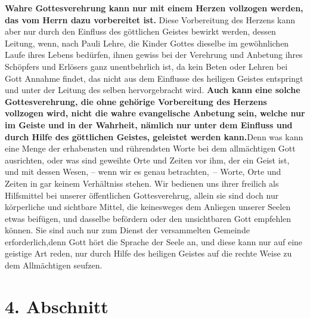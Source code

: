 \label{ref:06_03_gottesdiensvorbereitung}
\textbf{Wahre
Gottesverehrung kann nur mit einem Herzen vollzogen werden, das vom Herrn
dazu vorbereitet ist.} Diese Vorbereitung des Herzens kann aber nur
durch den Einfluss des göttlichen Geistes bewirkt werden, dessen Leitung, wenn,
nach Pauli Lehre, die Kinder Gottes dieselbe im gewöhnlichen Laufe ihres Lebens
bedürfen, ihnen gewiss bei der Verehrung und Anbetung ihres Schöpfers und
Erlösers ganz unentbehrlich ist, da kein Beten oder Lehren bei Gott Annahme
findet,
das nicht aus dem Einflusse des
heiligen Geistes entspringt und unter der Leitung des selben hervorgebracht
wird. \textbf{Auch kann eine solche Gottesverehrung,
die ohne
gehörige Vorbereitung des Herzens vollzogen wird, nicht die wahre evangelische
Anbetung sein, welche nur im Geiste und in der Wahrheit, nämlich nur unter dem
Einfluss und durch Hilfe des göttlichen Geistes, geleistet werden
kann.}Denn was kann eine Menge der
erhabensten und rührendsten Worte bei dem
allmächtigen Gott ausrichten, oder was sind geweihte Orte und Zeiten vor
ihm, der ein Geist ist, und mit dessen Wesen, -- wenn wir es genau betrachten,~-- Worte, Orte und Zeiten in gar keinem Verhältniss stehen. Wir bedienen uns
ihrer freilich als Hilfsmittel bei unserer öffentlichen Gottesverehrug, allein
sie sind doch nur körperliche und sichtbare Mittel, die keinesweges dem Anliegen
unserer
Seelen etwas beifügen, und dasselbe befördern oder den unsichtbaren Gott
empfehlen können. Sie sind auch nur
zum Dienst der versammelten Gemeinde erforderlich,denn
Gott hört die Sprache
der Seele an, und diese kann
nur auf eine geistige Art reden, nur durch
Hilfe des heiligen Geistes auf die
rechte Weise zu dem Allmächtigen seufzen.

\section{4. Abschnitt} \label{kap6_ab4}

